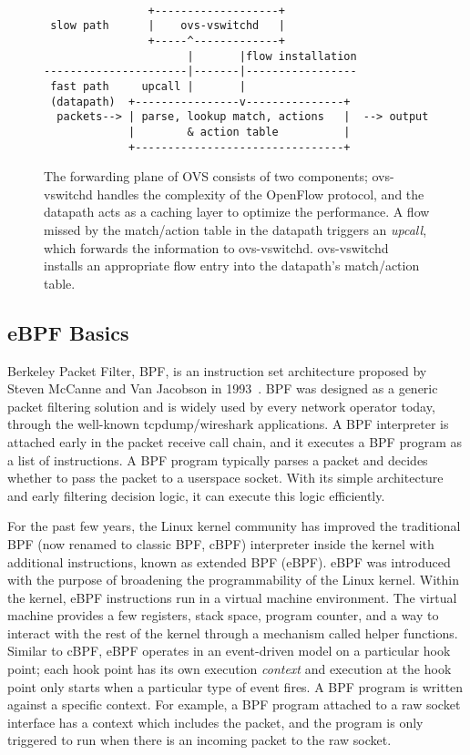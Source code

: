 \documentclass[10pt,numbers,reprint]{sigplanconf}
\begin{document}
\begin{figure}
{\scriptsize
\begin{verbatim}
              
                +-------------------+
 slow path      |    ovs-vswitchd   |
                +-----^-------------+
                      |       |flow installation
----------------------|-------|-----------------
 fast path     upcall |       | 
 (datapath)  +----------------v---------------+ 
  packets--> | parse, lookup match, actions   |  --> output
             |        & action table          |
             +--------------------------------+
\end{verbatim}
}
\vspace{-1.0em}
\caption{
The forwarding plane of OVS consists of two components;
ovs-vswitchd handles the complexity of the OpenFlow protocol, and the
datapath acts as a caching layer to optimize the performance.  A flow
missed by the match/action table in the datapath triggers an {\em
upcall}, which forwards the information to ovs-vswitchd.  ovs-vswitchd
installs an appropriate flow entry into the datapath's match/action table.}
\label{ovsintro}
\vspace{-1.0em}
\end{figure}

\subsection{eBPF Basics}\label{sec:ebpf}
Berkeley Packet Filter, BPF, is an instruction set architecture
proposed by Steven McCanne and Van Jacobson in 1993~\cite{cbpf}.  
BPF was designed as a generic packet filtering solution and is widely
used by every network operator today, through the well-known tcpdump/wireshark
applications. A BPF interpreter is attached early in the packet receive call
chain, and it executes a BPF program as a list of instructions.
A BPF program typically parses a packet and decides
whether to pass the packet to a userspace socket.  With its simple architecture
and early filtering decision logic, it can execute this logic efficiently.

For the past few years, the Linux kernel community has improved the traditional
BPF (now renamed to classic BPF, cBPF) interpreter inside the kernel with
additional instructions, known as extended BPF (eBPF). eBPF was introduced with
the purpose of broadening the programmability of the Linux kernel. Within the
kernel, eBPF instructions run in a virtual machine environment. The virtual
machine provides a few registers, stack space, program counter, and a way to
interact with the rest of the kernel through a mechanism called helper
functions.  Similar to cBPF, eBPF operates in an event-driven model on a
particular hook point; each hook point has its own execution {\em context} and
execution at the hook point only starts when a particular type of event fires.
A BPF program is written against a specific context. For example, a BPF program
attached to a raw socket interface has a context which includes the packet, and
the program is only triggered to run when there is an incoming packet to the
raw socket.
\end{document}
